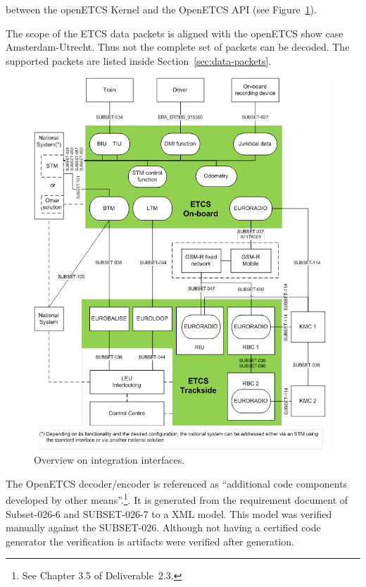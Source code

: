 between the openETCS Kernel and the OpenETCS API (see Figure~\ref{fig:integration}).


The scope of the ETCS data packets is aligned with the openETCS show case
Amsterdam-Utrecht.
Thus not the complete set of packets can be decoded.
The supported packets are listed inside Section~\ref{sec:data-packets}.

\begin{figure}[hbt]
\begin{center}
\includegraphics[width=0.99\textwidth]{figures/integration.png}
\caption{\label{fig:integration}
        Overview on integration interfaces.}
\end{center}
\end{figure}

\FloatBarrier
 
The OpenETCS decoder/encoder is referenced
as ``additional code components developed by other means''.\footnote{
	See Chapter 3.5 of Deliverable~2.3.
}.
It is generated from the requirement document of Subset-026-6
and SUBSET-026-7 to a XML model.
This model was verified manually against the SUBSET-026. 
Although not having a certified code generator the verification
is artifacts were verified after generation.


